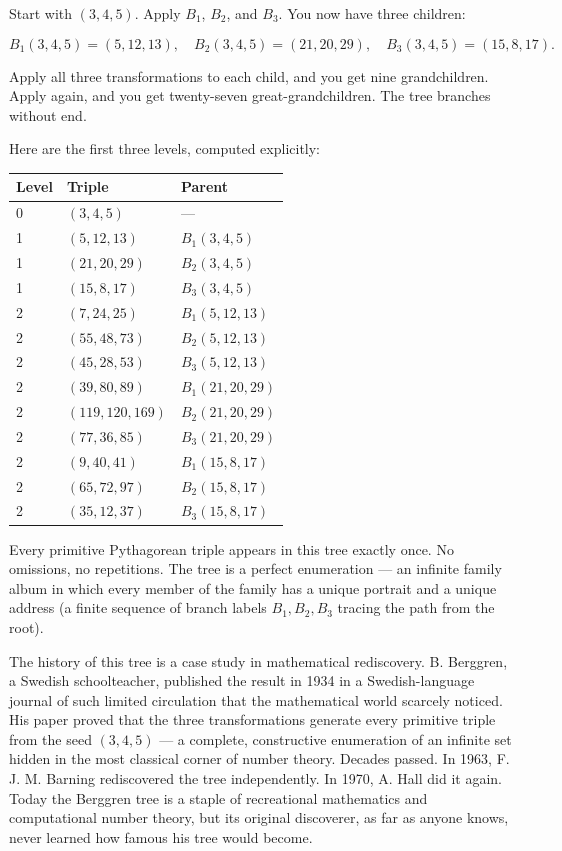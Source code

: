 

Start with $(3, 4, 5)$. Apply $B_1$, $B_2$, and $B_3$. You now have three children:

\[B_1(3, 4, 5) = (5, 12, 13), \quad B_2(3, 4, 5) = (21, 20, 29), \quad B_3(3, 4, 5) = (15, 8, 17).\]

Apply all three transformations to each child, and you get nine grandchildren. Apply again, and you get twenty-seven great-grandchildren. The tree branches without end.

Here are the first three levels, computed explicitly:


\begin{center}
\begin{tabular}{lll}
\toprule
Level & Triple & Parent \\
\midrule
0 & $(3, 4, 5)$ & --- \\
1 & $(5, 12, 13)$ & $B_1(3,4,5)$ \\
1 & $(21, 20, 29)$ & $B_2(3,4,5)$ \\
1 & $(15, 8, 17)$ & $B_3(3,4,5)$ \\
2 & $(7, 24, 25)$ & $B_1(5,12,13)$ \\
2 & $(55, 48, 73)$ & $B_2(5,12,13)$ \\
2 & $(45, 28, 53)$ & $B_3(5,12,13)$ \\
2 & $(39, 80, 89)$ & $B_1(21,20,29)$ \\
2 & $(119, 120, 169)$ & $B_2(21,20,29)$ \\
2 & $(77, 36, 85)$ & $B_3(21,20,29)$ \\
2 & $(9, 40, 41)$ & $B_1(15,8,17)$ \\
2 & $(65, 72, 97)$ & $B_2(15,8,17)$ \\
2 & $(35, 12, 37)$ & $B_3(15,8,17)$ \\
\bottomrule
\end{tabular}
\end{center}


Every primitive Pythagorean triple appears in this tree exactly once. No omissions, no repetitions. The tree is a perfect enumeration --- an infinite family album in which every member of the family has a unique portrait and a unique address (a finite sequence of branch labels $B_1, B_2, B_3$ tracing the path from the root).


The history of this tree is a case study in mathematical rediscovery. B. Berggren, a Swedish schoolteacher, published the result in 1934 in a Swedish-language journal of such limited circulation that the mathematical world scarcely noticed. His paper proved that the three transformations generate every primitive triple from the seed $(3, 4, 5)$ --- a complete, constructive enumeration of an infinite set hidden in the most classical corner of number theory. Decades passed. In 1963, F. J. M. Barning rediscovered the tree independently. In 1970, A. Hall did it again. Today the Berggren tree is a staple of recreational mathematics and computational number theory, but its original discoverer, as far as anyone knows, never learned how famous his tree would become.

